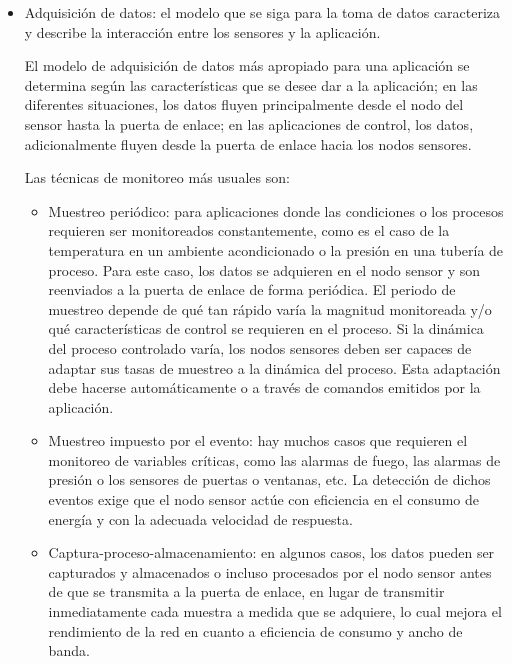 \begin{itemize}
    Los protocolos utilizados por el receptor y por los nodos de sensores permiten el encaminamiento e integración de los datos con los protocolos de red de manera eficiente a través del medio inalámbrico, distribuyendo el trabajo de los nodos sensores.

	Los nodos sensores están debidamente coordinados y administrados para que realicen tareas que disminuyan el consumo total de energía; por ejemplo, informar a sus vecinos cuando su nivel de energía es bajo y por tanto no puede participar en el intercambio de mensajes.

    \item Adquisición de datos: 
    el modelo que se siga para la toma de datos caracteriza y describe la interacción entre los sensores y la aplicación.

    El modelo de adquisición de datos más apropiado para una aplicación se determina según las características que se desee dar a la aplicación; en las diferentes situaciones, los datos fluyen principalmente desde el nodo del sensor hasta la puerta de enlace; en las aplicaciones de control, los datos, adicionalmente fluyen desde la puerta de enlace hacia los nodos sensores.

	Las técnicas de monitoreo más usuales \cite{Cecilio-2014} son:
	\begin{itemize}
 		\item Muestreo periódico: para aplicaciones donde las condiciones o los procesos requieren ser monitoreados constantemente, como es el caso de la temperatura en un ambiente acondicionado o la presión en una tubería de proceso. Para este caso, los datos se adquieren en el nodo sensor y son reenviados a la puerta de enlace de forma periódica. El periodo de muestreo depende de qué tan rápido varía la magnitud monitoreada y/o qué características de control se requieren en el proceso. Si la dinámica del proceso controlado varía, los nodos sensores deben ser capaces de adaptar sus tasas de muestreo a la dinámica del proceso. Esta adaptación debe hacerse automáticamente o a través de comandos emitidos por la aplicación.
		\item Muestreo impuesto por el evento: hay muchos casos que requieren el monitoreo de variables críticas, como las alarmas de fuego, las alarmas de presión o los sensores de puertas o ventanas, etc. La detección de dichos eventos exige que el nodo sensor actúe con eficiencia en el consumo de energía y con la adecuada velocidad de respuesta.
		\item Captura-proceso-almacenamiento: en algunos casos, los datos pueden ser capturados y almacenados o incluso procesados por el nodo sensor antes de que se transmita a la puerta de enlace, en lugar de transmitir inmediatamente cada muestra a medida que se adquiere, lo cual mejora el rendimiento de la red en cuanto a eficiencia de consumo y ancho de banda.
	\end{itemize}
\end{itemize}

